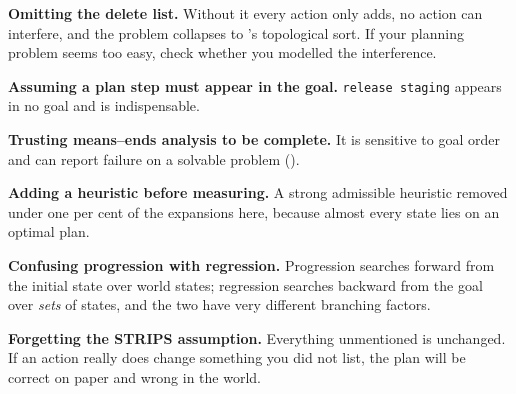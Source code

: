 \begin{pitfall}
\begin{tight}
  \item \textbf{Omitting the delete list.} Without it every action only adds, no
        action can interfere, and the problem collapses to
        's topological sort. If your planning problem seems too
        easy, check whether you modelled the interference.
  \item \textbf{Assuming a plan step must appear in the goal.}
        \texttt{release staging} appears in no goal and is indispensable.
  \item \textbf{Trusting means--ends analysis to be complete.} It is sensitive to
        goal order and can report failure on a solvable problem
        ().
  \item \textbf{Adding a heuristic before measuring.} A strong admissible heuristic
        removed under one per cent of the expansions here, because almost every
        state lies on an optimal plan.
  \item \textbf{Confusing progression with regression.} Progression searches
        forward from the initial state over world states; regression searches
        backward from the goal over \emph{sets} of states, and the two have very
        different branching factors.
  \item \textbf{Forgetting the STRIPS assumption.} Everything unmentioned is
        unchanged. If an action really does change something you did not list, the
        plan will be correct on paper and wrong in the world.
\end{tight}
\end{pitfall}

